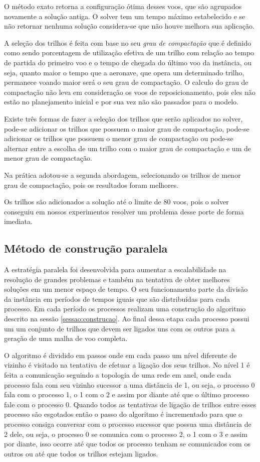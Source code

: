 O método exato retorna a configuração ótima desses voos, que
são agrupados novamente a solução antiga. O solver tem um tempo máximo
estabelecido e se não retornar nenhuma solução considera-se que não houve
melhora sua aplicação.

A seleção dos trilhos é feita com base no seu
\textit{grau de compactação} que é definido como sendo porcentagem de
utilização efetiva de um trilho com relação ao tempo de partida do primeiro voo
e o tempo de chegada do último voo da instância, ou seja, quanto maior o tempo
que a aeronave, que opera um determinado trilho, permanece voando maior será o
seu grau de compactação. O calculo do grau de compactação não leva em
consideração os voos de reposicionamento, pois eles não estão no planejamento
inicial e por sua vez não são passados para o modelo.

Existe três formas de fazer a seleção dos trilhos que serão aplicados no solver,
pode-se adicionar os trilhos que possuem o maior grau de compactação, pode-se
adicionar os trilhos que possuem o menor grau de compactação ou pode-se alternar
entre a escolha de um trilho com o maior grau de compactação e um de menor grau
de compactação.

Na prática adotou-se a segunda abordagem, selecionando os trilhos de menor grau
de compactação, pois os resultados foram melhores.
 
Os trilhos são adicionados a solução até o limite de 80 voos, pois o solver
conseguiu em nossos experimentos resolver um problema desse porte de forma
imediata. 

\subsection{Método de construção paralela}

A estratégia paralela foi desenvolvida para aumentar a escalabilidade na
resolução de grandes problemas e também na tentativa de obter melhores soluções
em um menor espaço de tempo. O seu funcionamento parte da divisão da instância
em períodos de tempos iguais que são distribuídas para cada processo. Em cada
período os processos realizam uma construção do algoritmo descrito na sessão
\ref{sessao:construcao}. Ao final dessa etapa cada processo possui um um
conjunto de trilhos que devem ser ligados uns com os outros para a geração de
uma malha de voo completa.
 
O algoritmo é dividido em passos onde em cada passo um
nível diferente de vizinho é visitado na tentativa de efetuar a ligação dos seus
trilhos. No nível 1 é feita a comunicação seguindo a topologia de uma
rede em anel, onde cada processo fala com seu vizinho sucessor a uma distância
de 1, ou seja, o processo 0 fala com o processo 1, o 1 com o 2 e assim por
diante até que o último processo fale com o processo 0. Quando todos as tentativas de
ligação de trilhos entre esses processo são esgotados então o passo do algoritmo
é incrementado para que o processo consiga conversar com o processo sucessor que
possua uma distância de 2 dele, ou seja, o processo 0 se comunica com o processo
2, o 1 com o 3 e assim por diante, isso ocorre até que todos os processo tenham
se comunicados com os outros ou até que todos os trilhos estejam ligados.

